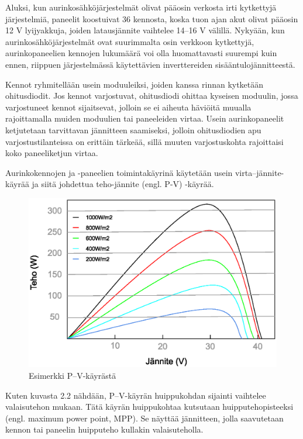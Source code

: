   Aluksi, kun aurinkosähköjärjestelmät olivat pääosin verkosta irti kytkettyjä järjestelmiä, paneelit koostuivat 36 kennosta, koska tuon ajan akut olivat pääosin 12 V lyijyakkuja, joiden latausjännite vaihtelee 14–16 V välillä. Nykyään, kun aurinkosähköjärjestelmät ovat suurimmalta osin verkkoon kytkettyjä, aurinkopaneelien kennojen lukumäärä voi olla huomattavasti suurempi kuin ennen, riippuen järjestelmässä käytettävien inverttereiden sisääntulojännitteestä. \parencite{Messenger}

  Kennot ryhmitellään usein moduuleiksi, joiden kanssa rinnan kytketään ohitusdiodit. Jos kennot varjostuvat, ohitusdiodi ohittaa kyseisen moduulin, jossa varjostuneet kennot sijaitsevat, jolloin se ei aiheuta häviöitä muualla rajoittamalla muiden moduulien tai paneeleiden virtaa. Usein aurinkopaneelit ketjutetaan tarvittavan jännitteen saamiseksi, jolloin ohitusdiodien apu varjostustilanteissa on erittäin tärkeää, sillä muuten varjostuskohta rajoittaisi koko paneeliketjun virtaa. \parencite{Willeke&Weber}

  Aurinkokennojen ja -paneelien toimintakäyrinä käytetään usein virta--jännite-käyrää ja siitä johdettua teho-jännite (engl. P-V) -käyrää. \begin{figure}[h]
    \centering
    \includegraphics[width=\textwidth]{figures/pvcurve}
    \caption{Esimerkki P--V-käyrästä}
  \end{figure} Kuten kuvasta 2.2 nähdään, P--V-käyrän huippukohdan sijainti vaihtelee valaisutehon mukaan. Tätä käyrän huippukohtaa kutsutaan huipputehopisteeksi (engl. maximum power point, MPP). Se näyttää jännitteen, jolla saavutetaan kennon tai paneelin huipputeho kullakin valaisuteholla.


